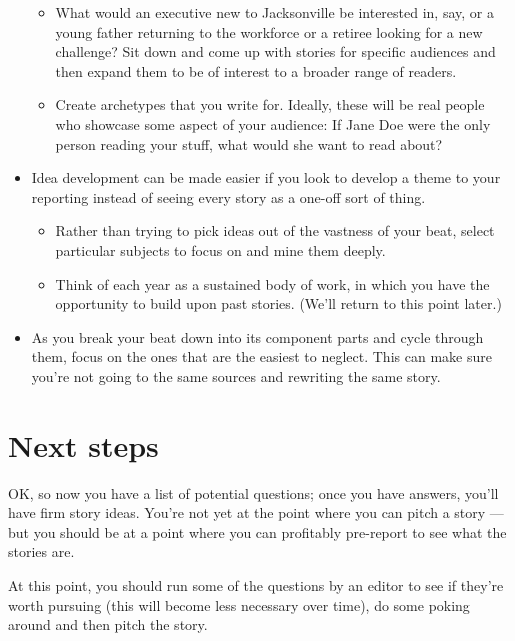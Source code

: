 \documentclass[
  12pt,
  american,
  letterpaperpaper,
  extrafontsizes,onecolumn,openright
  ]{memoir}
\providecommand{\tightlist}{%
  \setlength{\itemsep}{0pt}\setlength{\parskip}{0pt}}
\begin{document}
\begin{itemize}
  \begin{itemize}
  \tightlist
  \item
    What would an executive new to Jacksonville be interested in, say, or a young father returning to the workforce or a retiree looking for a new challenge? Sit down and come up with stories for specific audiences and then expand them to be of interest to a broader range of readers.
  \item
    Create archetypes that you write for. Ideally, these will be real people who showcase some aspect of your audience: If Jane Doe were the only person reading your stuff, what would she want to read about?
  \end{itemize}
\item
  Idea development can be made easier if you look to develop a theme to your reporting instead of seeing every story as a one-off sort of thing.

  \begin{itemize}
  \tightlist
  \item
    Rather than trying to pick ideas out of the vastness of your beat, select particular subjects to focus on and mine them deeply.
  \item
    Think of each year as a sustained body of work, in which you have the opportunity to build upon past stories. (We'll return to this point later.)
  \end{itemize}
\item
  As you break your beat down into its component parts and cycle through them, focus on the ones that are the easiest to neglect. This can make sure you're not going to the same sources and rewriting the same story.
\end{itemize}

\hypertarget{next-steps-1}{%
\section*{Next steps}\label{next-steps-1}}

OK, so now you have a list of potential questions; once you have answers, you'll have firm story ideas. You're not yet at the point where you can pitch a story --- but you should be at a point where you can profitably pre-report to see what the stories are.

At this point, you should run some of the questions by an editor to see if they're worth pursuing (this will become less necessary over time), do some poking around and then pitch the story.
\end{document}
